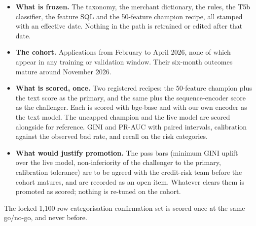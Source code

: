 \begin{itemize}
\item \textbf{What is frozen.} The taxonomy, the merchant dictionary, the rules, the T5b classifier, the feature SQL and the 50-feature champion recipe, all stamped with an effective date. Nothing in the path is retrained or edited after that date.
\item \textbf{The cohort.} Applications from February to April 2026, none of which appear in any training or validation window. Their six-month outcomes mature around November 2026.
\item \textbf{What is scored, once.} Two registered recipes: the 50-feature champion plus the text score as the primary, and the same plus the sequence-encoder score as the challenger. Each is scored with bge-base and with our own encoder as the text model. The uncapped champion and the live model are scored alongside for reference. GINI and PR-AUC with paired intervals, calibration against the observed bad rate, and recall on the risk categories.
\item \textbf{What would justify promotion.} The pass bars (minimum GINI uplift over the live model, non-inferiority of the challenger to the primary, calibration tolerance) are to be agreed with the credit-risk team before the cohort matures, and are recorded as an open item. Whatever clears them is promoted as scored; nothing is re-tuned on the cohort.
\end{itemize}
The locked 1,100-row categorisation confirmation set is scored once at the same go/no-go, and never before.

